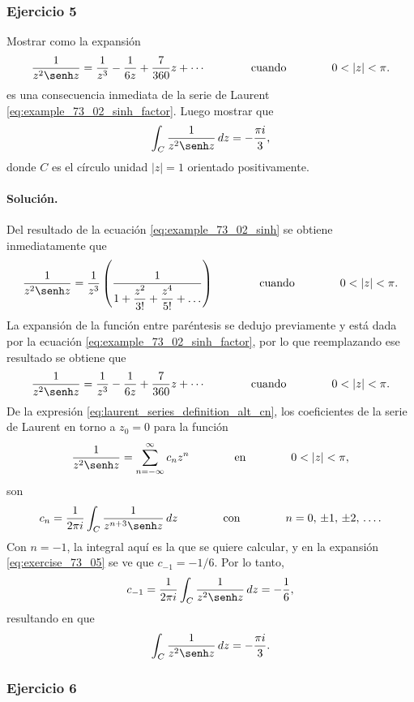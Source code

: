 \documentclass[a4paper]{report}
\begin{document}
\subsubsection*{Ejercicio 5}

Mostrar como la expansión 
\[
 \frac{1}{z^2\senh z}=\frac{1}{z^3}-\frac{1}{6z}+\frac{7}{360}z+\cdots
 \qquad\qquad\textrm{cuando}\qquad\qquad
  0<|z|<\pi.
\]
es una consecuencia inmediata de la serie de Laurent \ref{eq:example_73_02_sinh_factor}. Luego mostrar que 
\[
 \int_C\frac{1}{z^2\senh z}\,dz=-\frac{\pi i}{3},
\]
donde \(C\) es el círculo unidad \(|z|=1\) orientado positivamente.

\paragraph{Solución.} Del resultado de la ecuación \ref{eq:example_73_02_sinh} se obtiene inmediatamente que 
\[
 \frac{1}{z^2\senh z}=\frac{1}{z^3}\left(\dfrac{1}{1+\dfrac{z^2}{3!}+\dfrac{z^4}{5!}+\dots}\right)
 \qquad\qquad\textrm{cuando}\qquad\qquad
  0<|z|<\pi.
\]
La expansión de la función entre paréntesis se dedujo previamente y está dada por la ecuación \ref{eq:example_73_02_sinh_factor}, por lo que reemplazando ese resultado se obtiene que 
\begin{equation}\label{eq:exercise_73_05}
 \frac{1}{z^2\senh z}=\frac{1}{z^3}-\frac{1}{6z}+\frac{7}{360}z+\cdots
 \qquad\qquad\textrm{cuando}\qquad\qquad
  0<|z|<\pi. 
\end{equation}
De la expresión \ref{eq:laurent_series_definition_alt_cn}, los coeficientes de la serie de Laurent en torno a \(z_0=0\) para la función
\[
 \frac{1}{z^2\senh z}=\sum_{n=-\infty}^\infty c_n z^n
 \qquad\qquad\textrm{en}\qquad\qquad
 0<|z|<\pi,
\]
son
\[
 c_n=\frac{1}{2\pi i}\int_C\frac{1}{z^{n+3}\senh z}\,dz
 \qquad\qquad\textrm{con}\qquad\qquad
 n=0,\,\pm1,\,\pm2,\,\dots. 
\]
Con \(n=-1\), la integral aquí es la que se quiere calcular, y en la expansión \ref{eq:exercise_73_05} se ve que \(c_{-1}=-1/6\). Por lo tanto,
\[
 c_{-1}=\frac{1}{2\pi i}\int_C\frac{1}{z^2\senh z}\,dz=-\frac{1}{6},
\]
resultando en que 
\[
 \int_C\frac{1}{z^2\senh z}\,dz=-\frac{\pi i}{3}.
\]

\subsubsection*{Ejercicio 6}
\end{document}
